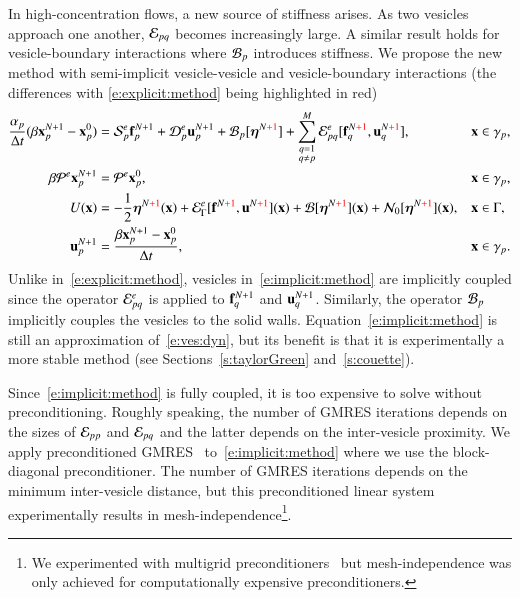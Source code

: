 In high-concentration flows, a new source of stiffness arises.  As two
vesicles approach one another, ${\mathcal{E}}_{pq}$ becomes increasingly large.
A similar result holds for vesicle-boundary interactions where
${\mathcal{B}}_{p}$ introduces stiffness.  We propose the new method with
semi-implicit vesicle-vesicle and vesicle-boundary interactions (the
differences with \eqref{e:explicit:method} being highlighted in red)
\begin{subequations}
  \begin{align}
    \frac{\alpha_{p}}{\Delta t}
    (\beta {\mathbf{x}}_{p}^{N+1} - {\mathbf{x}}_{p}^{0}) &= 
      {\mathcal{S}}_{p}^{e} {\mathbf{f}}_{p}^{N+1} + {\mathcal{D}}_{p}^{e}{\mathbf{u}}_{p}^{N+1} + 
      {\mathcal{B}}_{p}[{\boldsymbol\eta}^{N\textcolor{red}{+1}}] + \sum_{\substack{q=1 \\ q \neq p}}^{M} 
      {\mathcal{E}}_{pq}^{e}[{\mathbf{f}}_{q}^{N\textcolor{red}{+1}},
      {\mathbf{u}}_{q}^{N\textcolor{red}{+1}}],
      &&{\mathbf{x}} \in \gamma_{p},
      \label{e:vesicle:dynamic:imp} \\
      \beta \mathcal{P}^{e}{\mathbf{x}}_{p}^{N+1} &= \mathcal{P}^{e}{\mathbf{x}}_{p}^{0},
      &&{\mathbf{x}} \in \gamma_{p},
      \label{e:inextensibility:imp} \\
      U({\mathbf{x}}) &= -\frac{1}{2}{\boldsymbol\eta}^{N\textcolor{red}{+1}}({\mathbf{x}}) + 
      {\mathcal{E}}_{\Gamma}^{e}[{\mathbf{f}}^{N\textcolor{red}{+1}},
      {\mathbf{u}}^{N\textcolor{red}{+1}}]({\mathbf{x}}) + 
      {\mathcal{B}}[{\boldsymbol\eta}^{N\textcolor{red}{+1}}]({\mathbf{x}})+\mathcal{N}_{0}[{\boldsymbol\eta}^{N\textcolor{red}{+1}}]({\mathbf{x}}), &&{\mathbf{x}} \in \Gamma, 
      \label{e:BIE:imp} \\
      {\mathbf{u}}_{p}^{N+1} &= \frac{\beta {\mathbf{x}}_{p}^{N+1}-{\mathbf{x}}_{p}^{0}}{\Delta t},
      &&{\mathbf{x}} \in \gamma_{p}.
      \label{e:velocity:imp}
  \end{align}
  \label{e:implicit:method}
\end{subequations}
Unlike in~\eqref{e:explicit:method}, vesicles
in~\eqref{e:implicit:method} are implicitly coupled since the operator
${\mathcal{E}}_{pq}^{e}$ is applied to ${\mathbf{f}}_{q}^{N+1}$ and ${\mathbf{u}}_{q}^{N+1}$.
Similarly, the operator ${\mathcal{B}}_{p}$ implicitly couples the vesicles to the
solid walls.  Equation~\eqref{e:implicit:method} is still an
approximation of~\eqref{e:ves:dyn}, but its benefit is that it is
experimentally a more stable method (see Sections~\ref{s:taylorGreen}
and~\ref{s:couette}).

Since~\eqref{e:implicit:method} is fully coupled, it is too expensive to
solve without preconditioning.  Roughly speaking, the number of GMRES
iterations depends on the sizes of ${\mathcal{E}}_{pp}$ and ${\mathcal{E}}_{pq}$ and the
latter depends on the inter-vesicle proximity.  We apply preconditioned
GMRES~\cite{saad} to~\eqref{e:implicit:method} where we use the
block-diagonal preconditioner.  The number of GMRES iterations depends
on the minimum inter-vesicle distance, but this preconditioned linear
system experimentally results in mesh-independence\footnote{We
experimented with multigrid preconditioners~\cite{quaife:biros2013} but
mesh-independence was only achieved for computationally expensive
preconditioners.}.

